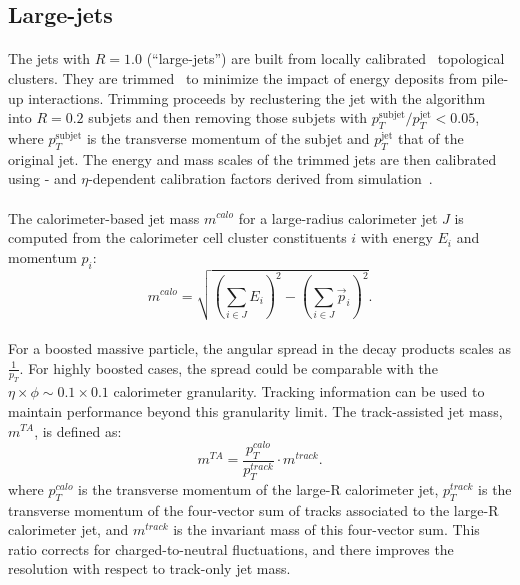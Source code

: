 \subsection{Large-\R jets}
\paragraph{}
The jets with $R=1.0$ (``large-\R jets'') are built from locally calibrated~\cite{Aad:2011he} topological clusters. They are trimmed~\cite{Krohn2010} to minimize the impact of energy deposits from pile-up interactions. 
Trimming proceeds by reclustering the jet with the \kt algorithm~\cite{Ellis:1993tq} into $R = 0.2$ subjets and then removing those subjets with $p_T^{\mathrm{subjet}}/p_T^{\mathrm{jet}} < 0.05$, where $p_T^{\mathrm{subjet}}$ is the transverse momentum of the subjet and $p_T^{\mathrm{jet}}$ that of the original jet. 
The energy and mass scales of the trimmed jets are then calibrated using \pt- and $\eta$-dependent calibration factors derived from simulation~\cite{PERF-2012-02}.

\paragraph{}
The calorimeter-based jet mass $m^{calo}$ for  a large-radius calorimeter jet $J$ is computed from the calorimeter cell cluster constituents $i$ with energy $E_i$ and momentum $p_i$:
\begin{equation}
m^{calo} = \sqrt{\left(\sum_{i\in J}E_i\right)^2-\left(\sum_{i\in J}\vec{p}_i\right)^2}.
\end{equation}

\paragraph{}
For a boosted massive particle, the angular spread in the decay products scales as $\frac{1}{p_T}$. 
For highly boosted cases, the spread could be comparable with the $\eta\times\phi \sim 0.1\times0.1$ calorimeter granularity. 
Tracking information can be used to maintain performance beyond this granularity limit.
The track-assisted jet mass, $m^{TA}$, is defined as:
\begin{equation}
m^{TA} = \frac{p_T^{calo}}{p_T^{track}} \cdot m^{track}.
\end{equation}
where $p_{T}^{calo}$ is the transverse momentum of the large-R calorimeter jet, $p_{T}^{track}$ is the transverse momentum of the four-vector sum of tracks associated to the large-R calorimeter jet, and $m^{track}$ is the invariant mass of this four-vector sum. This ratio corrects for charged-to-neutral fluctuations, and there improves the resolution with respect to track-only jet mass.

